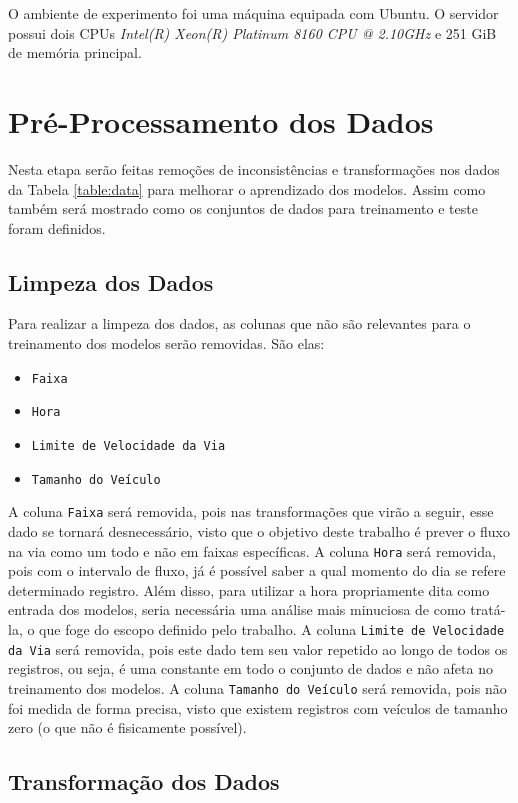 O ambiente de experimento foi uma máquina equipada com Ubuntu. O servidor possui dois CPUs \textit{Intel(R) Xeon(R) Platinum 8160 CPU @ 2.10GHz} e 251 GiB de memória principal.

\section{Pré-Processamento dos Dados}

Nesta etapa serão feitas remoções de inconsistências e transformações nos dados da Tabela \ref{table:data} para melhorar o aprendizado dos modelos. Assim como também será mostrado como os conjuntos de dados para treinamento e teste foram definidos.

\subsection{Limpeza dos Dados}

Para realizar a limpeza dos dados, as colunas que não são relevantes para o treinamento dos modelos serão removidas. São elas:

\begin{itemize}
    \item \texttt{Faixa}
    \item  \texttt{Hora}
    \item \texttt{Limite de Velocidade da Via}
    \item  \texttt{Tamanho do Veículo}
\end{itemize}

A coluna \texttt{Faixa} será removida, pois nas transformações que virão a seguir, esse dado se tornará desnecessário, visto que o objetivo deste trabalho é prever o fluxo na via como um todo e não em faixas específicas. A coluna \texttt{Hora} será removida, pois com o intervalo de fluxo, já é possível saber a qual momento do dia se refere determinado registro. Além disso, para utilizar a hora propriamente dita como entrada dos modelos, seria necessária uma análise mais minuciosa de como tratá-la, o que foge do escopo definido pelo trabalho. A coluna \texttt{Limite de Velocidade da Via} será removida, pois este dado tem seu valor repetido ao longo de todos os registros, ou seja, é uma constante em todo o conjunto de dados e não afeta no treinamento dos modelos. A coluna \texttt{Tamanho do Veículo} será removida, pois não foi medida de forma precisa, visto que existem registros com veículos de tamanho zero (o que não é fisicamente possível).

\subsection{Transformação dos Dados}

